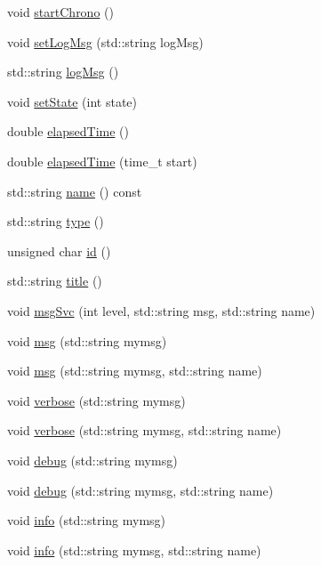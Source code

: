 \begin{DoxyCompactItemize}
void \hyperlink{classProcessus_a5e4d34b86241fa0756e07375a14ff4b2}{startChrono} ()
\item 
void \hyperlink{classProcessus_a471833f89047aa9a7ff6200a31c17a1d}{setLogMsg} (std::string logMsg)
\item 
std::string \hyperlink{classProcessus_a42fdeb17dc13ba854222666b6aa29b61}{logMsg} ()
\item 
void \hyperlink{classProcessus_ad38cde0f1bcefa00b068e7947b8af927}{setState} (int state)
\item 
double \hyperlink{classProcessus_aecca96218c65bc805c988cd95447df55}{elapsedTime} ()
\item 
double \hyperlink{classProcessus_a06d3815ad56593dfd0d3c1f534f8b146}{elapsedTime} (time\_\-t start)
\item 
std::string \hyperlink{classObject_a975e888d50bfcbffda2c86368332a5cd}{name} () const 
\item 
std::string \hyperlink{classObject_a84f99f70f144a83e1582d1d0f84e4e62}{type} ()
\item 
unsigned char \hyperlink{classObject_af99145335cc61ff6e2798ea17db009d2}{id} ()
\item 
std::string \hyperlink{classObject_a73a0f1a41828fdd8303dd662446fb6c3}{title} ()
\item 
void \hyperlink{classObject_a3f9d5537ebce0c0f2bf6ae4d92426f3c}{msgSvc} (int level, std::string msg, std::string name)
\item 
void \hyperlink{classObject_a58b2d0618c2d08cf2383012611528d97}{msg} (std::string mymsg)
\item 
void \hyperlink{classObject_ac5d59299273cee27aacf7de00d2e7034}{msg} (std::string mymsg, std::string name)
\item 
void \hyperlink{classObject_a83d2db2df682907ea1115ad721c1c4a1}{verbose} (std::string mymsg)
\item 
void \hyperlink{classObject_a2d4120195317e2a3c6532e8bb9f3da68}{verbose} (std::string mymsg, std::string name)
\item 
void \hyperlink{classObject_aac010553f022165573714b7014a15f0d}{debug} (std::string mymsg)
\item 
void \hyperlink{classObject_a6c9a0397ca804e04d675ed05683f5420}{debug} (std::string mymsg, std::string name)
\item 
void \hyperlink{classObject_a644fd329ea4cb85f54fa6846484b84a8}{info} (std::string mymsg)
\item 
void \hyperlink{classObject_a1ca123253dfd30fc28b156f521dcbdae}{info} (std::string mymsg, std::string name)

\end{DoxyCompactItemize}
